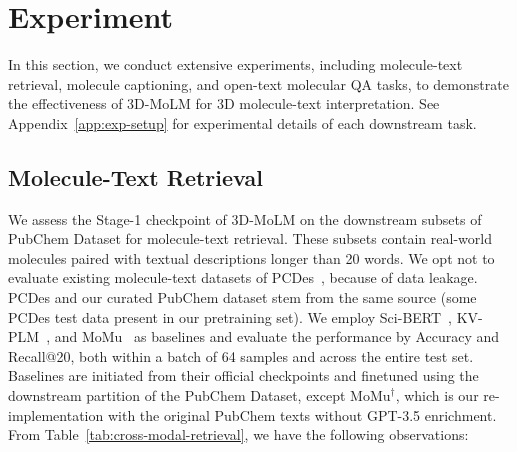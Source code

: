 \vspace{-0.2cm}
\section{Experiment} \label{sec:experiment}
\vspace{-0.2cm}
In this section, we conduct extensive experiments, including molecule-text retrieval, molecule captioning, and open-text molecular QA tasks, to demonstrate the effectiveness of 3D-MoLM for 3D molecule-text interpretation.
See Appendix~\ref{app:exp-setup} for experimental details of each downstream task.

\vspace{-0.1cm}
\subsection{Molecule-Text Retrieval}\label{sec:retrieval}
\vspace{-0.1cm}
We assess the Stage-1 checkpoint of 3D-MoLM on the downstream subsets of PubChem Dataset for molecule-text retrieval. 
These subsets contain real-world molecules paired with textual descriptions longer than 20 words. 
We opt not to evaluate existing molecule-text datasets of PCDes~\citep{kvplm}, because of data leakage. PCDes and our curated PubChem dataset stem from the same source (\ie some PCDes test data present in our pretraining set).
We employ Sci-BERT~\citep{scibert}, KV-PLM~\citep{kvplm}, and MoMu~\citep{momu} as baselines and evaluate the performance by Accuracy and Recall@20, both within a batch of 64 samples and across the entire test set. 
Baselines are initiated from their official checkpoints and finetuned using the downstream partition of the PubChem Dataset, except $\text{MoMu}^\dag$, which is our re-implementation with the original PubChem texts without GPT-3.5 enrichment.
From Table~\ref{tab:cross-modal-retrieval}, we have the following observations:


